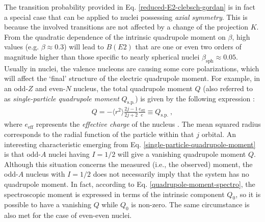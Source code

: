 The transition probability provided in Eq. \ref{reduced-E2-clebsch-gordan} is in fact a special case that can be applied to nuclei possessing \emph{axial symmetry}. This is because the involved transitions are not affected by a change of the projection $K$.
From the quadratic dependence of the intrinsic quadrupole moment on $\beta$, high values (e.g. $\beta\approx 0.3$) will lead to $B(E2)$ that are one or even two orders of magnitude higher than those specific to nearly spherical nuclei $\beta_\text{sph}\approx 0.05$. Usually in nuclei, the valence nucleons are causing some core polarizations, which will affect the `final' structure of the electric quadrupole moment. For example, in an odd-$Z$ and even-$N$ nucleus, the total quadrupole moment $Q$ (also referred to as \emph{single-particle quadrupole moment} $Q_\text{s.p.}$) is given by the following expression \cite{bertulani2007nuclear}:
\begin{align}
    Q=-\langle r^2\rangle\frac{2j-1}{2j+2}\frac{e_\text{eff}}{e}\equiv Q_\text{s.p.}\ ,
    \label{single-particle-quadrupole-moment}
\end{align}
where $e_\text{eff}$ represents the \emph{effective charge} of the nucleus \cite{heyde1994nuclear}. The mean squared radius corresponds to the radial function of the particle within that $j$ orbital. 
An interesting characteristic emerging from Eq. \ref{single-particle-quadrupole-moment} is that odd-$A$ nuclei having $I=1/2$ will give a vanishing quadrupole moment $Q$. Although this situation concerns the measured (i.e., the observed) moment, the odd-$A$ nucleus with $I=1/2$ does not necessarily imply that the system has no quadrupole moment. In fact, according to Eq. \ref{quadrupole-moment-spectro}, the spectroscopic moment is expressed in terms of the intrinsic component $Q_0$, so it is possible to have a vanishing $Q$ while $Q_0$ is non-zero. The same circumstance is also met for the case of even-even nuclei.

